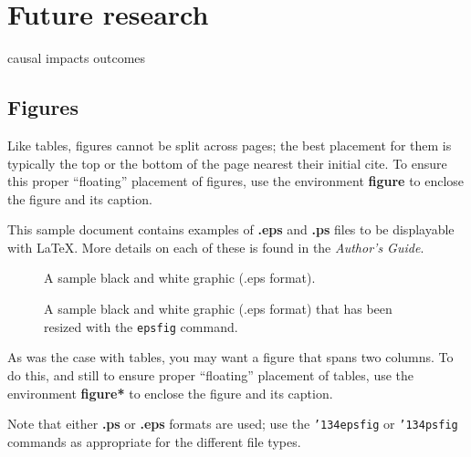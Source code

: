 \documentclass{acm_proc_article-sp}
\begin{document}
\section{Future research}
causal impacts outcomes


\subsection{Figures}
Like tables, figures cannot be split across pages; the
best placement for them
is typically the top or the bottom of the page nearest
their initial cite.  To ensure this proper ``floating'' placement
of figures, use the environment
\textbf{figure} to enclose the figure and its caption.

This sample document contains examples of \textbf{.eps}
and \textbf{.ps} files to be displayable with \LaTeX.  More
details on each of these is found in the \textit{Author's Guide}.

\begin{figure}
\centering
{}
\caption{A sample black and white graphic (.eps format).}
\end{figure}

\begin{figure}
\centering
{}
\caption{A sample black and white graphic (.eps format)
that has been resized with the \texttt{epsfig} command.}
\end{figure}


As was the case with tables, you may want a figure
that spans two columns.  To do this, and still to
ensure proper ``floating'' placement of tables, use the environment
\textbf{figure*} to enclose the figure and its caption.

Note that either {\textbf{.ps}} or {\textbf{.eps}} formats are
used; use
the \texttt{{\char'134}epsfig} or \texttt{{\char'134}psfig}
commands as appropriate for the different file types.



\balancecolumns
\end{document}
